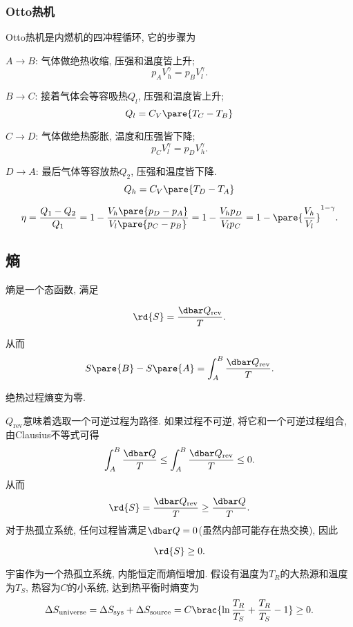 \documentclass[../Thermal.tex]{subfiles}
\begin{document}
\subsubsection{Otto热机}
Otto热机是内燃机的四冲程循环, 它的步骤为
\begin{cenum}
\item $A\rightarrow B$: 气体做绝热收缩, 压强和温度皆上升;
\[ p_AV_h^{\gamma} = p_BV_l^{\gamma}. \]
\item $B\rightarrow C$: 接着气体会等容吸热$Q_l$, 压强和温度皆上升;
\[ Q_l = C_V\pare{T_C - T_B} \]
\item $C\rightarrow D$: 气体做绝热膨胀, 温度和压强皆下降;
\[ p_CV_l^{\gamma} = p_DV_h^{\gamma}. \]
\item $D\rightarrow A$: 最后气体等容放热$Q_2$, 压强和温度皆下降.
\[ Q_h = C_V\pare{T_D - T_A} \]
\end{cenum}
\[ \eta = \frac{Q_1 - Q_2}{Q_1} = 1 - \frac{V_h\pare{p_D-p_A}}{V_l\pare{p_C-p_B}} = 1-\frac{V_hp_D}{V_lp_C} = 1 - \pare{\frac{V_h}{V_l}}^{1-\gamma}. \]
\subsection{熵}
\begin{definition}[熵]
熵是一个态函数, 满足
\begin{finale}
\[ \rd{S} = \frac{\dbar Q_{\mathrm{rev}}}{T}. \]
\end{finale}
\end{definition}
从而
\[ S\pare{B} - S\pare{A} = \int_A^B \frac{\dbar Q_{\mathrm{rev}}}{T}. \]
\begin{corollary}
绝热过程熵变为零.
\end{corollary}
$Q_{\mathrm{rev}}$意味着选取一个可逆过程为路径. 如果过程不可逆, 将它和一个可逆过程组合, 由Clausius不等式可得
\[ \int_A^B \frac{\dbar Q}{T} \le \int_A^B\frac{\dbar Q_{\mathrm{rev}}}{T} \le 0. \]
从而
\[ \rd{S} = \frac{\dbar Q_{\mathrm{rev}}}{T} \ge \frac{\dbar Q}{T}. \]
对于热孤立系统, 任何过程皆满足$\dbar Q = 0$(虽然内部可能存在热交换), 因此
\begin{finale}
\[ \rd{S} \ge 0. \]
\end{finale}
\begin{ex}
宇宙作为一个热孤立系统, 内能恒定而熵恒增加. 假设有温度为$T_R$的大热源和温度为$T_S$, 热容为$C$的小系统, 达到热平衡时熵变为
\[ \Delta S_{\mathrm{universe}} = \Delta S_{\mathrm{sys}} + \Delta S_{\mathrm{source}} = C\brac{\ln \frac{T_R}{T_S} + \frac{T_R}{T_S} - 1} \ge 0. \]
\end{ex}
\end{document}
